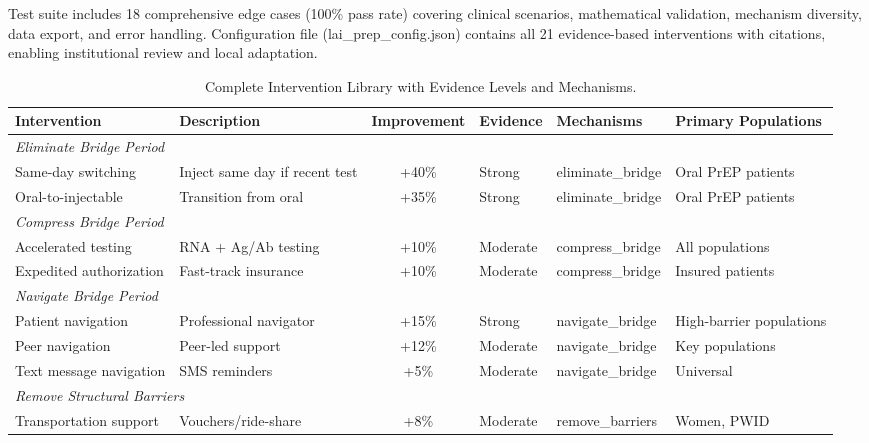Test suite includes 18 comprehensive edge cases (100\% pass rate) covering clinical scenarios, mathematical validation, mechanism diversity, data export, and error handling. Configuration file (lai\_prep\_config.json) contains all 21 evidence-based interventions with citations, enabling institutional review and local adaptation.



\begin{table}[H]
\caption{Complete Intervention Library with Evidence Levels and Mechanisms.}
\label{tab:interventions_complete}
\scriptsize
\begin{tabular}{lp{3cm}cllp{4cm}}
\toprule
\textbf{Intervention} & \textbf{Description} & \textbf{Improvement} & \textbf{Evidence} & \textbf{Mechanisms} & \textbf{Primary Populations} \\
\midrule
\multicolumn{6}{l}{\textit{Eliminate Bridge Period}} \\
Same-day switching & Inject same day if recent test & +40\% & Strong & eliminate\_bridge & Oral PrEP patients \\
Oral-to-injectable & Transition from oral & +35\% & Strong & eliminate\_bridge & Oral PrEP patients \\
\midrule
\multicolumn{6}{l}{\textit{Compress Bridge Period}} \\
Accelerated testing & RNA + Ag/Ab testing & +10\% & Moderate & compress\_bridge & All populations \\
Expedited authorization & Fast-track insurance & +10\% & Moderate & compress\_bridge & Insured patients \\
\midrule
\multicolumn{6}{l}{\textit{Navigate Bridge Period}} \\
Patient navigation & Professional navigator & +15\% & Strong & navigate\_bridge & High-barrier populations \\
Peer navigation & Peer-led support & +12\% & Moderate & navigate\_bridge & Key populations \\
Text message navigation & SMS reminders & +5\% & Moderate & navigate\_bridge & Universal \\
\midrule
\multicolumn{6}{l}{\textit{Remove Structural Barriers}} \\
Transportation support & Vouchers/ride-share & +8\% & Moderate & remove\_barriers & Women, PWID \\

\end{tabular}
\end{table}
